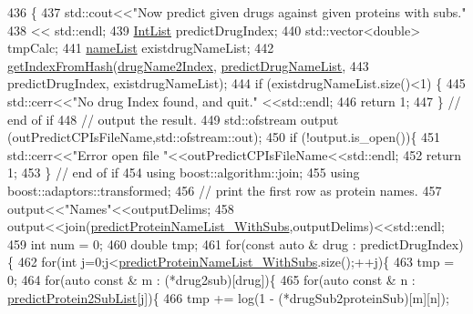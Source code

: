 \begin{DoxyCode}
436                                       \{
437     std::cout<<\textcolor{stringliteral}{"Now predict given drugs against given proteins with subs."}
438              << std::endl;
439     \hyperlink{namespacegift_a786390fe70b2e3b6d61dba1014651f03}{IntList} predictDrugIndex;
440     std::vector<double> tmpCalc;
441     \hyperlink{namespacegift_a62f85efaab3bff48335863ae0670c7a7}{nameList} existdrugNameList;
442     \hyperlink{namespacegift_a835110af070bdfb37d092c6a7f79d65c}{getIndexFromHash}(\hyperlink{namespacegift_a3385bc2f0aa26289e7f7d69635207e5d}{drugName2Index}, 
      \hyperlink{namespacegift_a9cc6da68eeea28ac6c6a65cd9f248e5b}{predictDrugNameList},
443                      predictDrugIndex, existdrugNameList);
444     \textcolor{keywordflow}{if} (existdrugNameList.size()<1) \{
445       std::cerr<<\textcolor{stringliteral}{"No drug Index found, and quit."} <<std::endl;
446       \textcolor{keywordflow}{return} 1;
447     \} \textcolor{comment}{// end of if}
448     \textcolor{comment}{// output the result.}
449     std::ofstream output (outPredictCPIsFileName,std::ofstream::out);
450     \textcolor{keywordflow}{if} (!output.is\_open())\{
451       std::cerr<<\textcolor{stringliteral}{"Error open file "}<<outPredictCPIsFileName<<std::endl;
452       \textcolor{keywordflow}{return} 1;
453     \} \textcolor{comment}{// end of if}
454     \textcolor{keyword}{using} boost::algorithm::join;
455     \textcolor{keyword}{using} boost::adaptors::transformed;
456     \textcolor{comment}{// print the first row as protein names.}
457     output<<\textcolor{stringliteral}{"Names"}<<outputDelims;
458     output<<join(\hyperlink{namespacegift_a03aaa96d826b6a887accc3951939ccde}{predictProteinNameList\_WithSubs},outputDelims)<<std::endl;
459     \textcolor{keywordtype}{int} num = 0;
460     \textcolor{keywordtype}{double} tmp;
461     \textcolor{keywordflow}{for}(\textcolor{keyword}{const} \textcolor{keyword}{auto} & drug : predictDrugIndex)\{
462       \textcolor{keywordflow}{for}(\textcolor{keywordtype}{int} j=0;j<\hyperlink{namespacegift_a03aaa96d826b6a887accc3951939ccde}{predictProteinNameList\_WithSubs}.size();++j)\{
463         tmp = 0;
464         \textcolor{keywordflow}{for}(\textcolor{keyword}{auto} \textcolor{keyword}{const} & m : (*drug2sub)[drug])\{
465           \textcolor{keywordflow}{for}(\textcolor{keyword}{auto} \textcolor{keyword}{const} & n : \hyperlink{namespacegift_a4899f631bc8342759f4096e7b653eed8}{predictProtein2SubList}[j])\{
466             tmp += log(1 - (*drugSub2proteinSub)[m][n]);

\end{DoxyCode}
